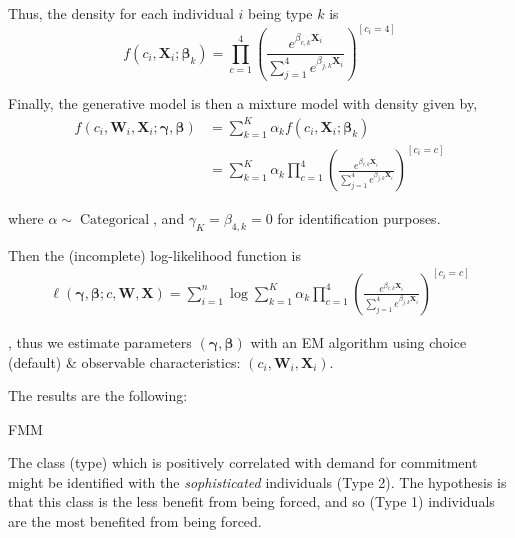 \documentclass[oneside,11pt]{article}
\begin{document}
Thus, the density for each individual $i$ being type $k$ is
\[f(c_i,\mathbf{X}_i; \bm\beta_{k}) = \prod_{c=1}^4\left(\frac{e^{\beta_{c,k} \mathbf{X}_i}}{\sum_{j=1}^{4} e^{\beta_{j,k}  \mathbf{X}_i}}\right)^{[c_i=4]}\]

Finally, the generative model is then a mixture model with density given by,
\begin{align*}
    f(c_i ,\mathbf{W}_i, \mathbf{X}_i; \bm{\gamma},\bm{\beta}) &= \sum_{k=1}^K \alpha_k f(c_i,\mathbf{X}_i; \bm\beta_{k}) \\
    &= \sum_{k=1}^K \alpha_k \prod_{c=1}^4\left(\frac{e^{\beta_{c,k} \mathbf{X}_i}}{\sum_{j=1}^{4} e^{\beta_{j,k}  \mathbf{X}_i}}\right)^{[c_i=c]} 
\end{align*}



where $\alpha\sim \operatorname{Categorical}$, and $\gamma_{K} = \beta_{4,k}=0$ for identification purposes. 

Then the (incomplete) log-likelihood function is
\begin{align*}
    \ell(\bm{\gamma}, \bm{\beta}; c, \mathbf{W},  \mathbf{X}) = \sum_{i=1}^n \log\sum_{k=1}^K \alpha_k \prod_{c=1}^4\left(\frac{e^{\beta_{c,k} \mathbf{X}_i}}{\sum_{j=1}^{4} e^{\beta_{j,k}  \mathbf{X}_i}}\right)^{[c_i=c]} 
\end{align*}

, thus we estimate parameters $(\bm{\gamma}, \bm{\beta})$ with an EM algorithm using choice (default)
\& observable characteristics: $(c_i,\mathbf{W}_i,\mathbf{X}_i)$.

The results are the following:

\begin{table}[H]
\caption{FMM}
\label{iv_pf}
\begin{center}
\scriptsize{}
\end{center}
 \scriptsize

\end{table}



The class (type) which is positively correlated with demand for commitment might be identified with the \emph{sophisticated} individuals (Type 2). The hypothesis is that this class is the less benefit from being forced, and so (Type 1) individuals are the most benefited from being forced.
\end{document}
